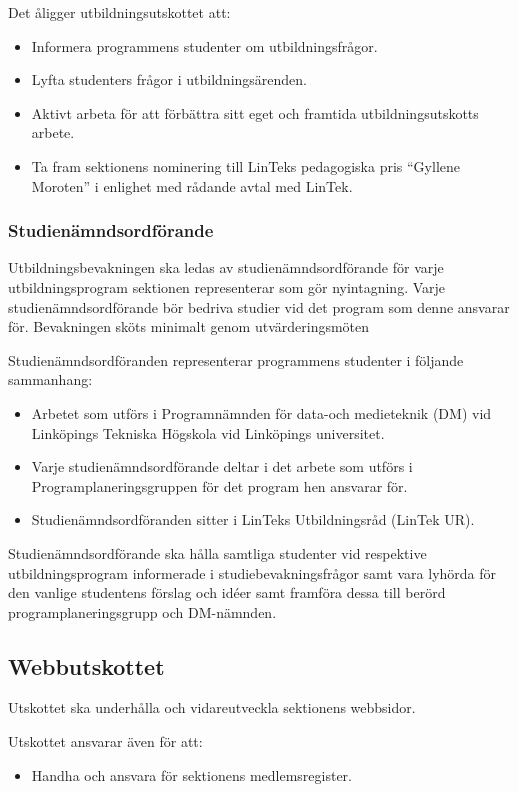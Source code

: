 \documentclass{datateknologsektionen-document}
\begin{document}
Det åligger utbildningsutskottet att:
\begin{itemize}
  \item Informera programmens studenter om utbildningsfrågor.
  \item Lyfta studenters frågor i utbildningsärenden.
  \item Aktivt arbeta för att förbättra sitt eget och framtida utbildningsutskotts arbete.
  \item Ta fram sektionens nominering till LinTeks pedagogiska pris ``Gyllene Moroten'' i enlighet med rådande avtal med LinTek.
\end{itemize}

\subsubsection{Studienämndsordförande}
Utbildningsbevakningen ska ledas av studienämndsordförande för varje utbildningsprogram
sektionen representerar som gör nyintagning. Varje studienämndsordförande bör bedriva
studier vid det program som denne ansvarar för. Bevakningen sköts minimalt genom utvärderingsmöten

Studienämndsordföranden representerar programmens studenter i följande sammanhang:
\begin{itemize}
  \item Arbetet som utförs i Programnämnden för data-och medieteknik (DM) vid Linköpings Tekniska Högskola vid Linköpings universitet.
  \item Varje studienämndsordförande deltar i det arbete som utförs i Programplaneringsgruppen för det program hen ansvarar för.
  \item Studienämndsordföranden sitter i LinTeks Utbildningsråd (LinTek UR).
\end{itemize}

Studienämndsordförande ska hålla samtliga studenter vid respektive utbildningsprogram
informerade i studiebevakningsfrågor samt vara lyhörda för den vanlige studentens
förslag och idéer samt framföra dessa till berörd programplaneringsgrupp och DM-nämnden.

\subsection{Webbutskottet}
Utskottet ska underhålla och vidareutveckla sektionens webbsidor.

Utskottet ansvarar även för att:
\begin{itemize}
  \item Handha och ansvara för sektionens medlemsregister.
\end{itemize}
\end{document}
